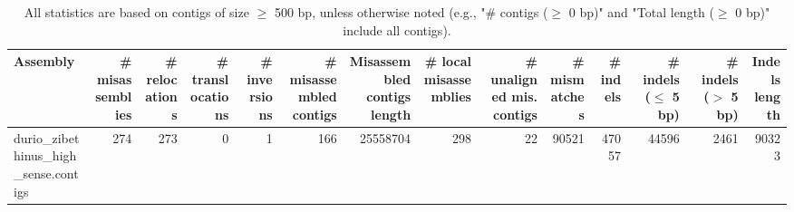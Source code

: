 \documentclass[12pt,a4paper]{article}
\begin{document}
\begin{table}[ht]
\begin{center}
\caption{All statistics are based on contigs of size $\geq$ 500 bp, unless otherwise noted (e.g., "\# contigs ($\geq$ 0 bp)" and "Total length ($\geq$ 0 bp)" include all contigs).}
\begin{tabular}{|l*{13}{|r}|}
\hline
Assembly & \# misassemblies &     \# relocations &     \# translocations &     \# inversions & \# misassembled contigs & Misassembled contigs length & \# local misassemblies & \# unaligned mis. contigs & \# mismatches & \# indels &     \# indels ($\leq$ 5 bp) &     \# indels ($>$ 5 bp) & Indels length \\ \hline
durio\_zibethinus\_high\_sense.contigs & 274 & 273 & 0 & 1 & 166 & 25558704 & 298 & 22 & 90521 & 47057 & 44596 & 2461 & 90323 \\ \hline
\end{tabular}
\end{center}
\end{table}
\end{document}
